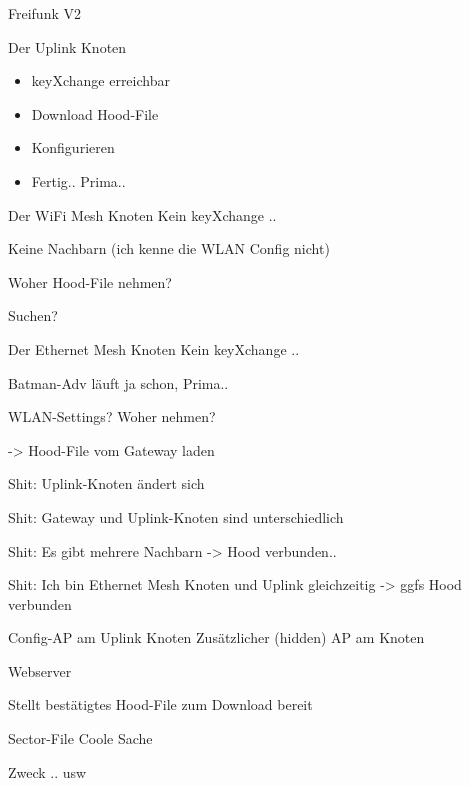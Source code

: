 \begin{frame}{Freifunk V2}
    \center
\end{frame}

\begin{frame}{Der Uplink Knoten}
    \begin{itemize}
        \item keyXchange erreichbar
        \item Download Hood-File
        \item Konfigurieren
        \item Fertig.. Prima..
    \end{itemize}
\end{frame}

\begin{frame}{Der WiFi Mesh Knoten}
    Kein keyXchange ..

    Keine Nachbarn (ich kenne die WLAN Config nicht)

    Woher Hood-File nehmen?

    Suchen?
\end{frame}

\begin{frame}{Der Ethernet Mesh Knoten}
    Kein keyXchange ..

    Batman-Adv läuft ja schon, Prima..

    WLAN-Settings? Woher nehmen?
    
    -> Hood-File vom Gateway laden

    Shit: Uplink-Knoten ändert sich

    Shit: Gateway und Uplink-Knoten sind unterschiedlich

    Shit: Es gibt mehrere Nachbarn -> Hood verbunden..

    Shit: Ich bin Ethernet Mesh Knoten und Uplink gleichzeitig -> ggfs Hood verbunden
\end{frame}

\begin{frame}{Config-AP am Uplink Knoten}
    Zusätzlicher (hidden) AP am Knoten

    Webserver

    Stellt bestätigtes Hood-File zum Download bereit
\end{frame}

\begin{frame}{Sector-File}
    Coole Sache

    Zweck .. usw
\end{frame}
